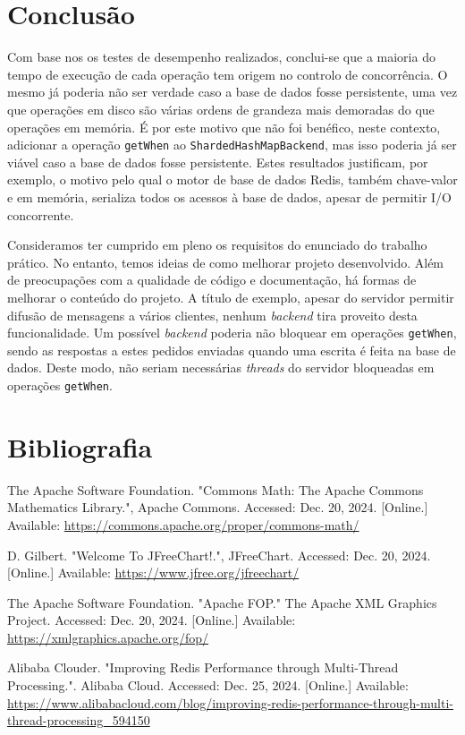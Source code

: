 \documentclass[11pt, a4paper]{article}
\begin{document}
\section{Conclusão}

Com base nos os testes de desempenho realizados, conclui-se que a maioria do tempo de execução de
cada operação tem origem no controlo de concorrência. O mesmo já poderia não ser verdade caso a
base de dados fosse persistente, uma vez que operações em disco são várias ordens de grandeza mais
demoradas do que operações em memória. É por este motivo que não foi benéfico, neste contexto,
adicionar a operação \texttt{getWhen} ao \texttt{ShardedHashMapBackend}, mas isso poderia já ser
viável caso a base de dados fosse persistente. Estes resultados justificam, por exemplo, o motivo
pelo qual o motor de base de dados Redis, também chave-valor e em memória, serializa todos os
acessos à base de dados, apesar de permitir I/O concorrente. \cite{redis}

Consideramos ter cumprido em pleno os requisitos do enunciado do trabalho prático. No entanto, temos
ideias de como melhorar projeto desenvolvido. Além de preocupações com a qualidade de código e
documentação, há formas de melhorar o conteúdo do projeto. A título de exemplo, apesar do servidor
permitir difusão de mensagens a vários clientes, nenhum \emph{backend} tira proveito desta
funcionalidade. Um possível \emph{backend} poderia não bloquear em operações \texttt{getWhen}, sendo
as respostas a estes pedidos enviadas quando uma escrita é feita na base de dados. Deste modo, não
seriam necessárias \emph{threads} do servidor bloqueadas em operações \texttt{getWhen}.

\section{Bibliografia}
\def\refname{}
\vspace{-1.5cm}
\begin{thebibliography}{9}
        The Apache Software Foundation. "Commons Math: The Apache Commons Mathematics Library."{},
        Apache Commons. Accessed: Dec. 20, 2024. [Online.] Available:
        \url{https://commons.apache.org/proper/commons-math/}

        D. Gilbert. "Welcome To JFreeChart!."{}, JFreeChart. Accessed: Dec. 20, 2024. [Online.]
        Available: \url{https://www.jfree.org/jfreechart/}

        The Apache Software Foundation. "Apache FOP."{} The Apache XML Graphics Project. Accessed:
        Dec. 20, 2024. [Online.] Available: \url{https://xmlgraphics.apache.org/fop/}

        Alibaba Clouder. "Improving Redis Performance through Multi-Thread Processing."{}.
        Alibaba Cloud. Accessed: Dec. 25, 2024. [Online.] Available:
        \url{https://www.alibabacloud.com/blog/improving-redis-performance-through-multi-thread-processing_594150}
\end{thebibliography}
\end{document}
